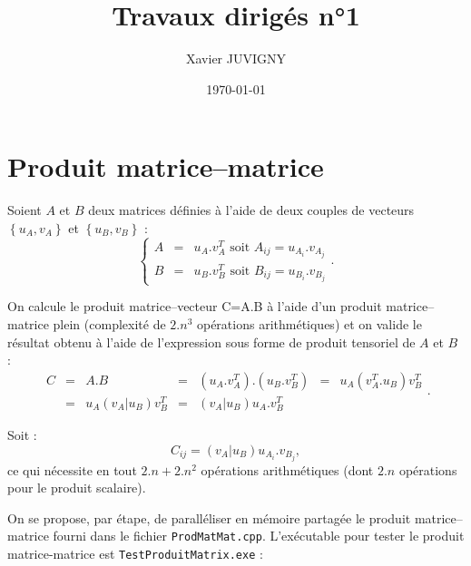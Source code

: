 \documentclass[11pt,a4paper]{article}
\author{Xavier JUVIGNY}
\date{\today}
\title{Travaux dirigés n°1}
\begin{document}
\maketitle
\tableofcontents

\section{Produit matrice--matrice}

Soient $A$ et $B$ deux matrices définies à l'aide de deux couples de vecteurs $\left\{u_{A},v_{A}\right\}$ et 
$\left\{u_{B},v_{B}\right\}$ :
\[
\left\{
	\begin{array}{lcl}
	A & = & u_{A}.v_{A}^{T}\mbox{ soit } A_{ij} = u_{A_{i}}.v_{A_{j}} \\
	B & = & u_{B}.v_{B}^{T}\mbox{ soit } B_{ij} = u_{B_{i}}.v_{B_{j}}
    \end{array}
\right..
\]

On calcule le produit matrice--vecteur C=A.B à l'aide d'un produit matrice--matrice plein (complexité de $2.n^{3}$ opérations arithmétiques)
et on valide le résultat obtenu à l'aide de l'expression sous forme de produit tensoriel de $A$ et $B$ :
\[
\begin{array}{lclclcl}
C & = & A.B & = & \left(u_{A}.v_{A}^{T}\right).\left(u_{B}.v_{B}^{T}\right) & = &  u_{A}\left(v_{A}^{T}.u_{B}\right)v_{B}^{T}\\
 &=& u_{A}\left(v_{A}|u_{B}\right)v_{B}^{T} & = & \left(v_{A}|u_{B}\right)u_{A}.v_{B}^{T}
 \end{array}.
\]

Soit :
\[
C_{ij} = \left(v_{A}|u_{B}\right)u_{A_{i}}.v_{B_{j}},
\]
ce qui nécessite en tout $2.n+2.n^{2}$ opérations arithmétiques (dont $2.n$ opérations pour le produit scalaire).

On se propose, par étape, de paralléliser en mémoire partagée le produit matrice--matrice fourni dans le fichier \texttt{ProdMatMat.cpp}. 
L'exécutable pour tester le produit matrice-matrice est \texttt{TestProduitMatrix.exe} :
\end{document}

